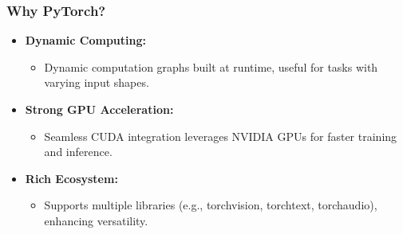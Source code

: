 \documentclass[aspectratio=169]{beamer}
\begin{document}
\begin{frame}[fragile]
    \frametitle{Why PyTorch?}
    \begin{itemize}
        \item \textbf{Dynamic Computing:} 
            \begin{itemize}
                \item Dynamic computation graphs built at runtime, useful for tasks with varying input shapes.
            \end{itemize}
        \item \textbf{Strong GPU Acceleration:} 
            \begin{itemize}
                \item Seamless CUDA integration leverages NVIDIA GPUs for faster training and inference.
            \end{itemize}
        \item \textbf{Rich Ecosystem:} 
            \begin{itemize}
                \item Supports multiple libraries (e.g., torchvision, torchtext, torchaudio), enhancing versatility.
            \end{itemize}
    \end{itemize}
\end{frame}
\end{document}

